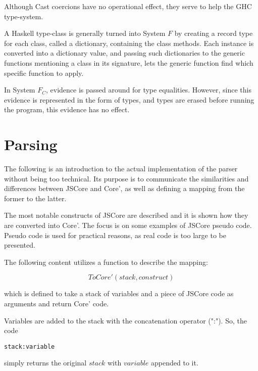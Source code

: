 Although Cast coercions have no operational effect, they serve to help the
GHC type-system.


A Haskell type-class is generally turned into System $F$ by creating a 
record type for each class, called a dictionary, containing the class methods.
Each instance is converted into a dictionary value, and passing such 
dictionaries to the generic functions mentioning a class in its signature,
lets the generic function find which specific function to apply.
\cite{sulzmann2007system}


In System $F_C$, evidence is passed around for type equalities. However,
since this evidence is represented in the form of types, and types are
erased before running the program, this evidence has no effect.
\cite{sulzmann2007system}

\section{Parsing}

The following is an introduction to the actual implementation
of the parser without being too technical. Its purpose is to communicate
the similarities and differences between JSCore 
and Core', as well as defining a mapping from the former to the latter.

The most notable constructs of JSCore are described and it is shown how they
are converted into Core'. The focus is on some examples of JSCore pseudo code.
Pseudo code is used for practical reasons, as real code is too large to be 
presented.

The following content utilizes a function to describe the mapping:

\begin{equation*}
ToCore'(stack, construct)
\end{equation*}

which is defined to take a stack of variables and a piece of JSCore code 
as arguments and return Core' code. 

Variables are added to the stack with the concatenation operator (":"). 
So, the code 
\lstset{ %
language=Haskell,
}
\begin{lstlisting}
stack:variable 
\end{lstlisting}
simply returns the original $stack$ with $variable$ appended to it.

